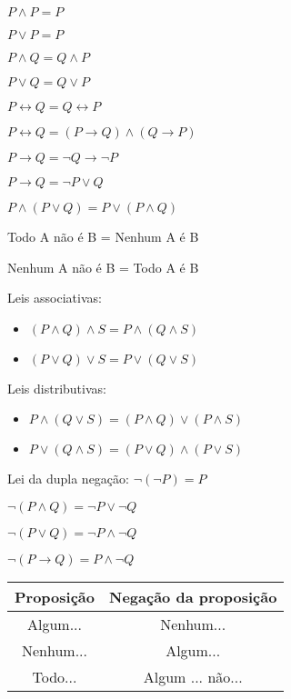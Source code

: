 \begin{tcolorbox}[sharp corners, colback=white,boxrule=1mm]
	$P \wedge P = P$

	$P \vee P = P$
	
	$P \wedge Q = Q \wedge P$
	
	$P \vee Q = Q \vee P$
	
	$P \leftrightarrow Q = Q \leftrightarrow P$
	
	$P \leftrightarrow Q = (P \rightarrow Q) \wedge (Q \rightarrow P)$
	
	$P \rightarrow Q = \neg Q \rightarrow \neg P$
	
	$P \rightarrow Q = \neg P \vee Q$
	
	$P \wedge (P \vee Q) = P \vee (P \wedge Q)$
	
	Todo A não é B = Nenhum A é B
	
	Nenhum A não é B = Todo A é B
	
	Leis associativas:
	\begin{itemize}
		\item $(P \wedge Q) \wedge S = P \wedge (Q \wedge S)$
		\item $(P \vee Q) \vee S = P \vee (Q \vee S)$
	\end{itemize}

	Leis distributivas:
	\begin{itemize}
		\item $P \wedge (Q \vee S) = (P \wedge Q) \vee (P \wedge S)$
		\item $P \vee (Q \wedge S) = (P \vee Q) \wedge (P \vee S)$
	\end{itemize}

	Lei da dupla negação:
	$\neg(\neg P) = P$
	
	$\neg (P \wedge Q) = \neg P \vee \neg Q$
	
	$\neg (P \vee Q) = \neg P \wedge \neg Q$
	
	$\neg (P \rightarrow Q) = P \wedge \neg Q$
	
	\begin{tabular}{|c|c|}
		\hline 
		Proposição & Negação da proposição \\ 
		\hline 
		Algum... & Nenhum... \\ 
		\hline 
		Nenhum... & Algum... \\ 
		\hline 
		Todo... & Algum ... não... \\ 
		\hline 
	\end{tabular} 
\end{tcolorbox}